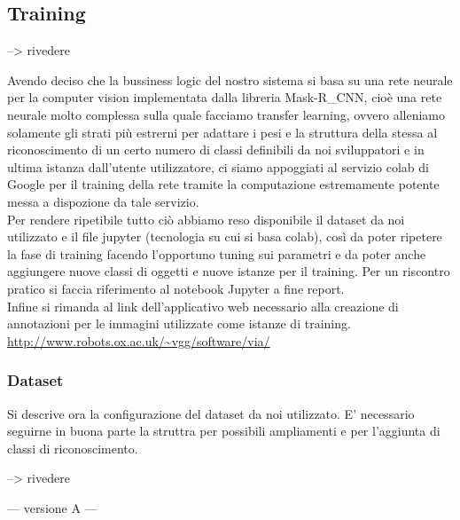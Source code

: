 \documentclass[12pt,a4paper]{article}
\newcommand{\mrcnn}{Mask-R\_CNN}
\begin{document}
\subsection{Training}

--> rivedere %

Avendo deciso che la bussiness logic del nostro sistema si basa su una rete
neurale per la computer vision implementata dalla libreria \mrcnn, cioè una
rete neurale molto complessa sulla quale facciamo transfer learning, ovvero
alleniamo solamente gli strati più estrerni per adattare i pesi e la struttura
della stessa al riconoscimento di un certo numero di classi definibili da noi
sviluppatori e in ultima istanza dall'utente utilizzatore, ci siamo appoggiati
al servizio colab di Google per il training della rete tramite la computazione
estremamente potente messa a dispozione da tale servizio.\\ Per
rendere ripetibile tutto ciò abbiamo reso disponibile il dataset da noi
utilizzato e il file jupyter (tecnologia su cui si basa colab), così da poter
ripetere la fase di training facendo l'opportuno tuning sui parametri e da
poter anche aggiungere nuove classi di oggetti e nuove istanze per il training.
Per un riscontro pratico si faccia riferimento al notebook Jupyter a
fine report.\\
Infine si rimanda al link dell'applicativo web necessario alla creazione di
annotazioni per le immagini utilizzate come istanze di training.
\url{http://www.robots.ox.ac.uk/~vgg/software/via/}

\subsubsection{Dataset}

Si descrive ora la configurazione del dataset da noi utilizzato. E' necessario
seguirne in buona parte la struttra per possibili ampliamenti e per l'aggiunta di classi di
riconoscimento.

--> rivedere %

--- versione A ---
\end{document}
